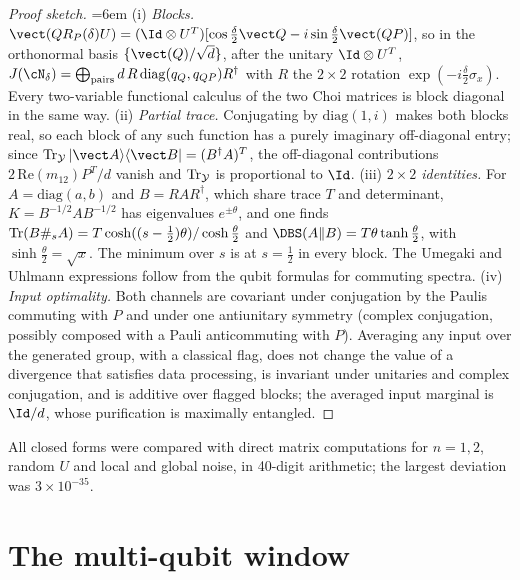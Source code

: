 \begin{proof}[Proof sketch]
{\emergencystretch=6em (i) \emph{Blocks.} $\vect(QR_P(\delta)U)=(\Id\otimes U^T)[\cos\frac\delta2\vect Q-i\sin\frac\delta2\vect(QP)]$, so in the orthonormal basis $\{\vect(Q)/\sqrt d\}$, after the unitary $\Id\otimes U^T$, $J(\cN_\delta)=\bigoplus_{\rm pairs}d\,R\,\mathrm{diag}(q_Q,q_{QP})R^\dagger$ with $R$ the $2\times2$ rotation $\exp(-i\frac\delta2\sigma_x)$. Every two-variable functional calculus of the two Choi matrices is block diagonal in the same way. (ii) \emph{Partial trace.} Conjugating by $\mathrm{diag}(1,i)$ makes both blocks real, so each block of any such function has a purely imaginary off-diagonal entry; since $\Tr_{\mathcal Y}|\vect A\rangle\langle\vect B|=(B^\dagger A)^T$, the off-diagonal contributions $2\,\mathrm{Re}(m_{12})P^T/d$ vanish and $\operatorname{Tr}_{\mathcal Y}$ is proportional to $\Id$. (iii) \emph{$2\times2$ identities.} For $A=\mathrm{diag}(a,b)$ and $B=RAR^\dagger$, which share trace $T$ and determinant, $K=B^{-1/2}AB^{-1/2}$ has eigenvalues $e^{\pm\theta}$, and one finds $\operatorname{Tr}(B\#_sA)=T\cosh((s-\frac12)\theta)/\cosh\frac\theta2$ and $\DBS(A\|B)=T\theta\tanh\frac\theta2$, with $\sinh\frac\theta2=\sqrt x$. The minimum over $s$ is at $s=\frac12$ in every block. The Umegaki and Uhlmann expressions follow from the qubit formulas for commuting spectra. (iv) \emph{Input optimality.} Both channels are covariant under conjugation by the Paulis commuting with $P$ and under one antiunitary symmetry (complex conjugation, possibly composed with a Pauli anticommuting with $P$). Averaging any input over the generated group, with a classical flag, does not change the value of a divergence that satisfies data processing, is invariant under unitaries and complex conjugation, and is additive over flagged blocks; the averaged input marginal is $\Id/d$, whose purification is maximally entangled.\par}
\end{proof}

All closed forms were compared with direct matrix computations for $n=1,2$, random $U$ and local and global noise, in 40-digit arithmetic; the largest deviation was $3\times10^{-35}$.

\section{The multi-qubit window}\label{gate:sec:window}

